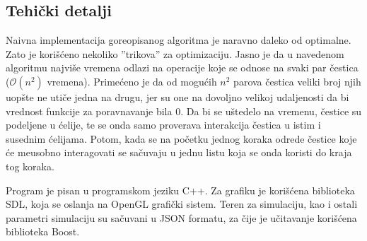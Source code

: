\documentclass[12pt]{article}
\begin{document}
    \subsection{Tehi\v cki detalji}
        Naivna implementacija goreopisanog algoritma je naravno daleko od optimalne. Zato je kori\v s\'ceno nekoliko ''trikova'' za optimizaciju. Jasno je da u navedenom algoritmu najvi\v se vremena odlazi na operacije koje se odnose na svaki par \v cestica ($\mathcal{O}(n^2)$ vremena). Prime\'ceno je da od mogu\'cih $n^2$ parova \v cestica veliki broj njih uop\v ste ne uti\v ce jedna na drugu, jer su one na dovoljno velikoj udaljenosti da bi vrednost funkcije za poravnavanje bila $0$. Da bi se u\v stedelo na vremenu, \v cestice su podeljene u \'celije, te se onda samo proverava interakcija \v cestica u istim i susednim \' celijama. Potom, kada se na po\v cetku jednog koraka odrede \v cestice koje \'ce me\dj usobno interagovati se sa\v cuvaju u jednu listu koja se onda koristi do kraja tog koraka.

        Program je pisan u programskom jeziku C++. Za grafiku je kori\v s\'cena biblioteka SDL, koja se oslanja na OpenGL grafi\v cki sistem.
        Teren za simulaciju, kao i ostali parametri simulaciju su sa\v cuvani u JSON formatu, za \v cije je u\v citavanje kori\v s\'cena biblioteka Boost.
\end{document}
